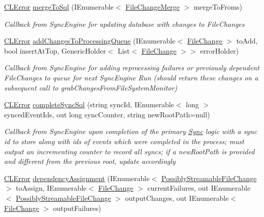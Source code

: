 \begin{DoxyCompactItemize}
\hyperlink{class_cloud_api_public_1_1_model_1_1_c_l_error}{C\-L\-Error} \hyperlink{interface_cloud_api_public_1_1_interfaces_1_1_i_sync_data_object_a0a80f822f5f543cc84ff07c1c9ac2a23}{merge\-To\-Sql} (I\-Enumerable$<$ \hyperlink{struct_cloud_api_public_1_1_model_1_1_file_change_merge}{File\-Change\-Merge} $>$ merge\-To\-Froms)
\begin{DoxyCompactList}\small\item\em Callback from Sync\-Engine for updating database with changes to File\-Changes \end{DoxyCompactList}\item 
\hyperlink{class_cloud_api_public_1_1_model_1_1_c_l_error}{C\-L\-Error} \hyperlink{interface_cloud_api_public_1_1_interfaces_1_1_i_sync_data_object_aa1863eed2344565068c951e0c4c0c22e}{add\-Changes\-To\-Processing\-Queue} (I\-Enumerable$<$ \hyperlink{class_cloud_api_public_1_1_model_1_1_file_change}{File\-Change} $>$ to\-Add, bool insert\-At\-Top, Generic\-Holder$<$ List$<$ \hyperlink{class_cloud_api_public_1_1_model_1_1_file_change}{File\-Change} $>$$>$ error\-Holder)
\begin{DoxyCompactList}\small\item\em Callback from Sync\-Engine for adding reprocessing failures or previously dependent File\-Changes to queue for next Sync\-Engine Run (should return these changes on a subsequent call to grab\-Changes\-From\-File\-System\-Monitor) \end{DoxyCompactList}\item 
\hyperlink{class_cloud_api_public_1_1_model_1_1_c_l_error}{C\-L\-Error} \hyperlink{interface_cloud_api_public_1_1_interfaces_1_1_i_sync_data_object_aa702b66aae31ba25cc10138182944db7}{complete\-Sync\-Sql} (string sync\-Id, I\-Enumerable$<$ long $>$ synced\-Event\-Ids, out long sync\-Counter, string new\-Root\-Path=null)
\begin{DoxyCompactList}\small\item\em Callback from Sync\-Engine upon completion of the primary \hyperlink{namespace_cloud_api_public_1_1_sync}{Sync} logic with a sync id to store along with ids of events which were completed in the process; must output an incrementing counter to record all syncs; if a new\-Root\-Path is provided and different from the previous root, update accordingly \end{DoxyCompactList}\item 
\hyperlink{class_cloud_api_public_1_1_model_1_1_c_l_error}{C\-L\-Error} \hyperlink{interface_cloud_api_public_1_1_interfaces_1_1_i_sync_data_object_a2b36076284fea39198c49ac28decae44}{dependency\-Assignment} (I\-Enumerable$<$ \hyperlink{struct_cloud_api_public_1_1_model_1_1_possibly_streamable_file_change}{Possibly\-Streamable\-File\-Change} $>$ to\-Assign, I\-Enumerable$<$ \hyperlink{class_cloud_api_public_1_1_model_1_1_file_change}{File\-Change} $>$ current\-Failures, out I\-Enumerable$<$ \hyperlink{struct_cloud_api_public_1_1_model_1_1_possibly_streamable_file_change}{Possibly\-Streamable\-File\-Change} $>$ output\-Changes, out I\-Enumerable$<$ \hyperlink{class_cloud_api_public_1_1_model_1_1_file_change}{File\-Change} $>$ output\-Failures)
$$
\end{DoxyCompactItemize}
